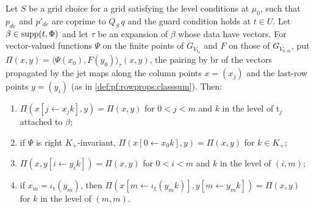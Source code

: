 \begin{theorem}\label{pf:rowprops:levelinv}
Let $S$ be a grid choice for a grid satisfying the level conditions at $\mu_0$, such that $p_{de}$ and $p'_{de}$ are coprime to
$Q_S\,q$ and the guard condition holds at $t\in U$. Let $\beta\in\mathrm{supp}(t,\Phi)$ and let $\tau$ be an expansion of $\beta$
whose data have vectors. For vector-valued functions $\Psi$ on the finite points of $G_{V_{\mathrm t_0}}$ and $F$ on those of
$G_{V_{0,m}}$, put $\Pi(x,y)=\langle\Psi(x_0),F(y_0)\rangle_{\tau}(x,y)$, the pairing by $\mathrm{br}$ of the vectors propagated
by the jet maps along the column points $x=(x_j)$ and the last-row points $y=(y_i)$ (as in \cref{def:pf:rowprops:classsum}).
Then:
\begin{enumerate}[label=(\alph*)]
\item $\Pi(x[j\leftarrow x_jk],y)=\Pi(x,y)$ for $0<j<m$ and $k$ in the level of $\mathrm t_j$ attached to $\beta$;
\item if $\Psi$ is right $K_+$-invariant, $\Pi(x[0\leftarrow x_0k],y)=\Pi(x,y)$ for $k\in K_+$;
\item $\Pi(x,y[i\leftarrow y_ik])=\Pi(x,y)$ for $0<i<m$ and $k$ in the level of $(i,m)$;
\item if $x_m=\iota_{\mathrm t}(y_m)$, then $\Pi(x[m\leftarrow\iota_{\mathrm t}(y_mk)],y[m\leftarrow y_mk])=\Pi(x,y)$ for $k$ in the
level of $(m,m)$.
\end{enumerate}
\end{theorem}

